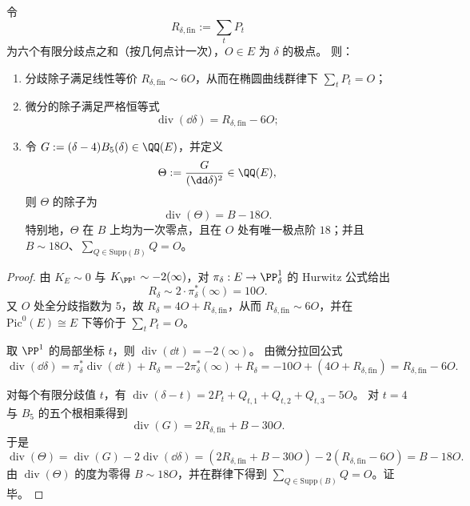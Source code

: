 \begin{conclusion}\label{con:xi-terminal-zm-delta-branch-complement-principal-divisor}
令
\[
R_{\delta,\mathrm{fin}}:=\sum_{t} P_t
\]
为六个有限分歧点之和（按几何点计一次），\(O\in E\) 为 \(\delta\) 的极点。
则：
\begin{enumerate}
  \item 分歧除子满足线性等价 \(R_{\delta,\mathrm{fin}}\sim 6O\)，从而在椭圆曲线群律下 \(\sum_t P_t=O\)；
  \item 微分的除子满足严格恒等式
  \[
  \operatorname{div}(\dd\delta)=R_{\delta,\mathrm{fin}}-6O;
  \]
  \item 令 \(G:=(\delta-4)B_5(\delta)\in\QQ(E)\)，并定义
  \[
  \Theta:=\frac{G}{(\dd\delta)^2}\in\QQ(E),
  \]
  则 \(\Theta\) 的除子为
  \[
  \operatorname{div}(\Theta)=B-18O.
  \]
  特别地，\(\Theta\) 在 \(B\) 上均为一次零点，且在 \(O\) 处有唯一极点阶 \(18\)；并且 \(B\sim 18O\)、\(\sum_{Q\in \mathrm{Supp}(B)}Q=O\)。
\end{enumerate}
\end{conclusion}
\begin{proof}
由 \(K_E\sim 0\) 与 \(K_{\PP^1}\sim -2(\infty)\)，对 \(\pi_\delta:E\to\PP^1_\delta\) 的 Hurwitz 公式给出
\[
R_\delta\sim 2\cdot \pi_\delta^*(\infty)=10O.
\]
又 \(O\) 处全分歧指数为 \(5\)，故
\(
R_\delta=4O+R_{\delta,\mathrm{fin}}
\)，从而 \(R_{\delta,\mathrm{fin}}\sim 6O\)，并在 \(\mathrm{Pic}^0(E)\cong E\) 下等价于 \(\sum_t P_t=O\)。
\par
取 \(\PP^1\) 的局部坐标 \(t\)，则 \(\operatorname{div}(\dd t)=-2(\infty)\)。
由微分拉回公式
\[
\operatorname{div}(\dd\delta)=\pi_\delta^*\operatorname{div}(\dd t)+R_\delta=-2\pi_\delta^*(\infty)+R_\delta=-10O+(4O+R_{\delta,\mathrm{fin}})=R_{\delta,\mathrm{fin}}-6O.
\]
\par
对每个有限分歧值 \(t\)，有
\(
\operatorname{div}(\delta-t)=2P_t+Q_{t,1}+Q_{t,2}+Q_{t,3}-5O
\)。
对 \(t=4\) 与 \(B_5\) 的五个根相乘得到
\[
\operatorname{div}(G)=2R_{\delta,\mathrm{fin}}+B-30O.
\]
于是
\[
\operatorname{div}(\Theta)=\operatorname{div}(G)-2\operatorname{div}(\dd\delta)
=(2R_{\delta,\mathrm{fin}}+B-30O)-2(R_{\delta,\mathrm{fin}}-6O)=B-18O.
\]
由 \(\operatorname{div}(\Theta)\) 的度为零得 \(B\sim 18O\)，并在群律下得到 \(\sum_{Q\in \mathrm{Supp}(B)}Q=O\)。证毕。
\end{proof}

